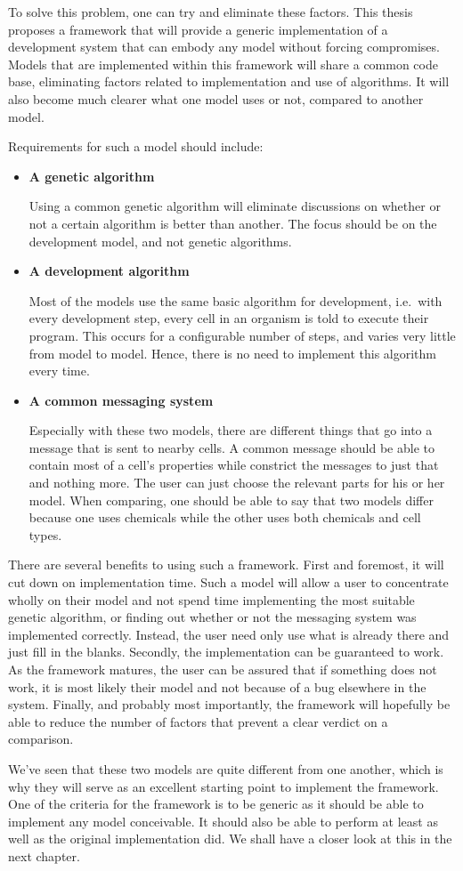 To solve this problem, one can try and eliminate these factors. This thesis proposes a framework that will provide a generic implementation of a development system that can embody any model without forcing compromises. Models that are implemented within this framework will share a common code base, eliminating factors related to implementation and use of algorithms. It will also become much clearer what one model uses or not, compared to another model.

Requirements for such a model should include:
\begin{itemize}
	\item\textbf{A genetic algorithm}

	Using a common genetic algorithm will eliminate discussions on whether or not a certain algorithm is better than another. The focus should be on the development model, and not genetic algorithms.

	\item\textbf{A development algorithm}

	Most of the models use the same basic algorithm for development, i.e.\ with every development step, every cell in an organism is told to execute their program. This occurs for a configurable number of steps, and varies very little from model to model. Hence, there is no need to implement this algorithm every time.

	\item\textbf{A common messaging system}

	Especially with these two models, there are different things that go into a message that is sent to nearby cells. A common message should be able to contain most of a cell's properties while constrict the messages to just that and nothing more. The user can just choose the relevant parts for his or her model. When comparing, one should be able to say that two models differ because one uses chemicals while the other uses both chemicals and cell types.
\end{itemize}

There are several benefits to using such a framework. First and foremost, it will cut down on implementation time. Such a model will allow a user to concentrate wholly on their model and not spend time implementing the most suitable genetic algorithm, or finding out whether or not the messaging system was implemented correctly. Instead, the user need only use what is already there and just fill in the blanks. Secondly, the implementation can be guaranteed to work. As the framework matures, the user can be assured that if something does not work, it is most likely their model and not because of a bug elsewhere in the system. Finally, and probably most importantly, the framework will hopefully be able to reduce the number of factors that prevent a clear verdict on a comparison.

We've seen that these two models are quite different from one another, which is why they will serve as an excellent starting point to implement the framework. One of the criteria for the framework is to be generic as it should be able to implement any model conceivable. It should also be able to perform at least as well as the original implementation did. We shall have a closer look at this in the next chapter.
